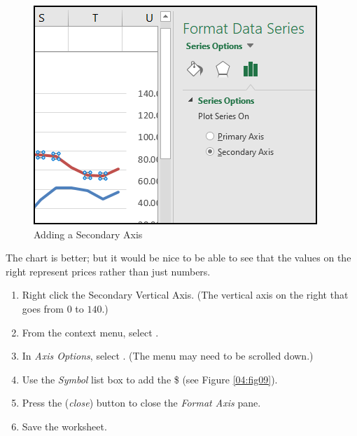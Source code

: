 \begin{figure}[H]
	\centering
	\includegraphics[width=\maxwidth{.75\linewidth}]{gfx/ch04_fig08}
	\caption{Adding a Secondary Axis}
	\label{04:fig08}
\end{figure}

The chart is better; but it would be nice to be able to see that the values on the right represent prices rather than just numbers.

\begin{enumerate}
	\item Right click the Secondary Vertical Axis. (The vertical axis on the right that goes from $ 0 $ to $ 140 $.)
	\item From the context menu, select .
	\item In \textit{Axis Options}, select . (The menu may need to be scrolled down.)
	\item Use the \textit{Symbol} list box to add the \$ (see Figure \ref{04:fig09}).
	\item Press the  (\textit{close}) button to close the \textit{Format Axis} pane.
	\item Save the  worksheet.
\end{enumerate}


